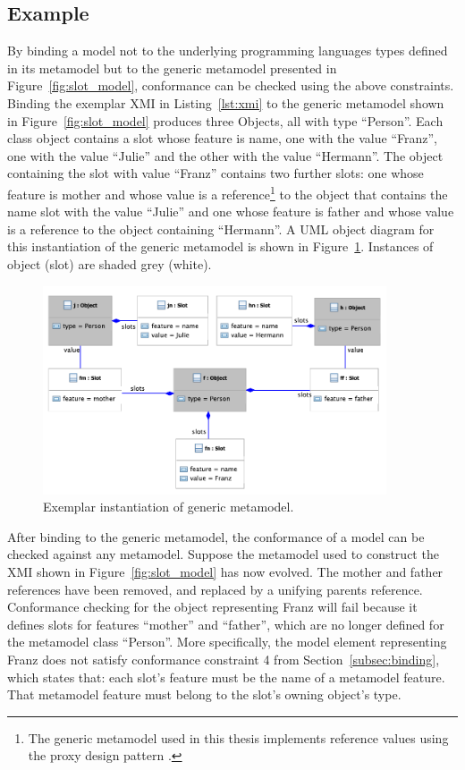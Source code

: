 \subsection{Example}
By binding a model not to the underlying programming languages types defined in its metamodel but to the generic metamodel presented in Figure~\ref{fig:slot_model}, conformance can be checked using the above constraints. Binding the exemplar XMI in Listing~\ref{lst:xmi} to the generic metamodel shown in Figure~\ref{fig:slot_model} produces three Objects, all with type ``Person''. Each class object contains a slot whose feature is name, one with the value ``Franz'', one with the value ``Julie'' and the other with the value ``Hermann''. The object containing the slot with value ``Franz'' contains two further slots: one whose feature is mother and whose value is a reference\footnote{The generic metamodel used in this thesis implements reference values using the proxy design pattern \cite{gamma95patterns}.} to the object that contains the name slot with the value ``Julie'' and one whose feature is father and whose value is a reference to the object containing ``Hermann''. A UML object diagram for this instantiation of the generic metamodel is shown in Figure~\ref{fig:generic_binding}. Instances of object (slot) are shaded grey (white).

\begin{figure}[htbp]
  \centering
  \includegraphics[width=4in]{5.Implementation/GenericBinding.pdf}
  \caption{Exemplar instantiation of generic metamodel.}
  \label{fig:generic_binding}
\end{figure}

After binding to the generic metamodel, the conformance of a model can be checked against any metamodel. Suppose the metamodel used to construct the XMI shown in Figure~\ref{fig:slot_model} has now evolved. The mother and father references have been removed, and replaced by a unifying parents reference. Conformance checking for the object representing Franz will fail because it defines slots for features ``mother'' and ``father'', which are no longer defined for the metamodel class ``Person''. More specifically, the model element representing Franz does not satisfy conformance constraint 4 from Section~\ref{subsec:binding}, which states that: each slot's feature must be the name of a metamodel feature. That metamodel feature must belong to the slot's owning object's type. 

